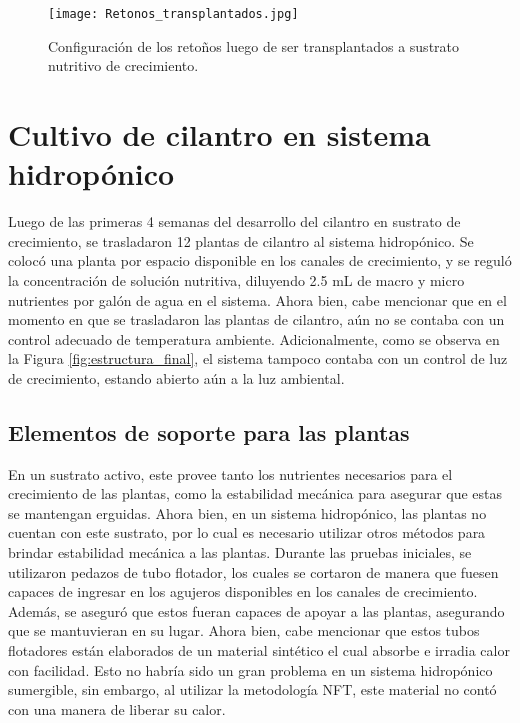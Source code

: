 \begin{figure}[H]
	\centering
	\texttt{[image: Retonos\_transplantados.jpg]}
	\caption{Configuración de los retoños luego de ser transplantados a sustrato nutritivo de crecimiento.}
	\label{fig:transplante_plantas}
\end{figure}


\section{Cultivo de cilantro en sistema hidropónico}

Luego de las primeras 4 semanas del desarrollo del cilantro en sustrato de crecimiento, se trasladaron 12 plantas de cilantro al sistema hidropónico. Se colocó una planta por espacio disponible en los canales de crecimiento, y se reguló la concentración de solución nutritiva, diluyendo 2.5 mL de macro y micro nutrientes por galón de agua en el sistema. Ahora bien, cabe mencionar que en el momento en que se trasladaron las plantas de cilantro, aún no se contaba con un control adecuado de temperatura ambiente. Adicionalmente, como se observa en la Figura \ref{fig:estructura_final}, el sistema tampoco contaba con un control de luz de crecimiento, estando abierto aún a la luz ambiental.

\subsection{Elementos de soporte para las plantas}

En un sustrato activo, este provee tanto los nutrientes necesarios para el crecimiento de las plantas, como la estabilidad mecánica para asegurar que estas se mantengan erguidas. Ahora bien, en un sistema hidropónico, las plantas no cuentan con este sustrato, por lo cual es necesario utilizar otros métodos para brindar estabilidad mecánica a las plantas. Durante las pruebas iniciales, se utilizaron pedazos de tubo flotador, los cuales se cortaron de manera que fuesen capaces de ingresar en los agujeros disponibles en los canales de crecimiento. Además, se aseguró que estos fueran capaces de apoyar a las plantas, asegurando que se mantuvieran en su lugar. Ahora bien, cabe mencionar que estos tubos flotadores están elaborados de un material sintético el cual absorbe e irradia calor con facilidad. Esto no habría sido un gran problema en un sistema hidropónico sumergible, sin embargo, al utilizar la metodología NFT, este material no contó con una manera de liberar su calor.

